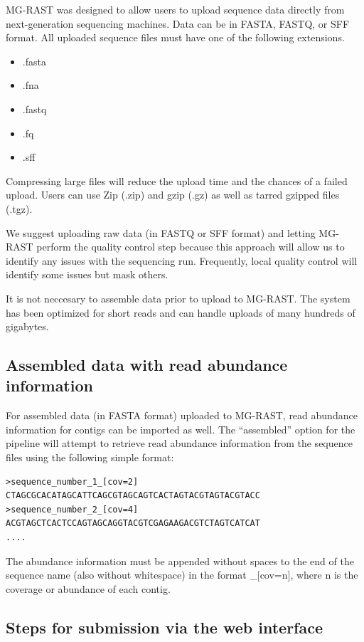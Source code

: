 \documentclass[12pt,fullpage]{report}
\begin{document}
MG-RAST was designed to allow users to upload sequence data directly from next-generation sequencing machines. Data can be in FASTA, FASTQ, or SFF format.
All uploaded sequence files must have one of the following extensions.
\begin{itemize}
\item .fasta
\item .fna
\item .fastq
\item  .fq
\item .sff 
\end{itemize}

Compressing large files will reduce the upload time and the chances of a failed upload. Users can use Zip (.zip) and gzip (.gz) as well as tarred gzipped files (.tgz).

We suggest uploading raw data (in FASTQ or SFF format) and letting MG-RAST perform the quality control step because
this approach will allow us to identify any issues with the sequencing run. Frequently, local quality control will identify some
issues but mask others.


It is not neccesary to assemble data prior to upload to MG-RAST. The system has been optimized for short reads and can handle uploads of many hundreds of gigabytes.
\subsection{Assembled data with read abundance information}
For assembled data (in FASTA format) uploaded to MG-RAST, read abundance information for contigs can be imported as well.
The ``assembled'' option for the pipeline will attempt to retrieve read abundance information from the sequence files using the following simple format:

\begin{verbatim}
>sequence_number_1_[cov=2]
CTAGCGCACATAGCATTCAGCGTAGCAGTCACTAGTACGTAGTACGTACC
>sequence_number_2_[cov=4]
ACGTAGCTCACTCCAGTAGCAGGTACGTCGAGAAGACGTCTAGTCATCAT
....
\end{verbatim}

The abundance information must be appended without spaces to the end of the sequence name (also without whitespace) in the format \_[cov=n], where n is the coverage or abundance of each contig.
\subsection{Steps for submission via the web interface}
\end{document}
